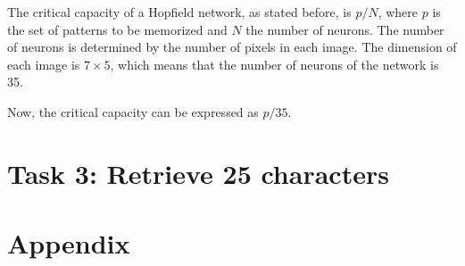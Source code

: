 \documentclass[10pt]{article}
\begin{document}
\begin{multicols}{2}
  The critical capacity of a Hopfield network, as stated before, is $p/N$,
  where $p$ is the set of patterns to be memorized and $N$ the number
  of neurons. The number of neurons is determined by the number of pixels
  in each image. The dimension of each image is $7 \times 5$, which means that
  the number of neurons of the network is 35.

  Now, the critical capacity can be expressed as $p/35$. 
  
  
  \section*{Task 3: Retrieve 25 characters}
  

\end{multicols}

  \section*{Appendix}
\end{document}
